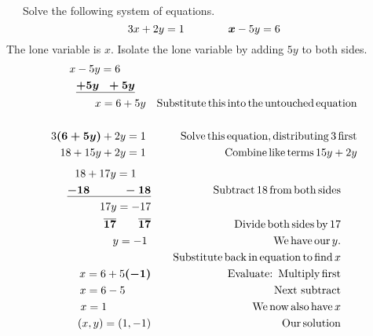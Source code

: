 \begin{example}~~~Solve the following system of equations.
	$$3 x + 2 y = 1\qquad\qquad \boldsymbol{x} - 5 y = 6$$
    The lone variable is $x$.  Isolate the lone variable by adding $5y$ to both sides.
		\begin{eqnarray*}		
		x - 5 y = 6~~~~~~~ & & \\
		\boldsymbol{\underline{+ 5 y ~~+ 5 y}}~~~  &  & \\
	  x = 6 + 5 y &  & \operatorname{Substitute} \operatorname{this} \operatorname{into} \operatorname{the}
  		\operatorname{untouched} \operatorname{equation}\\
    	& & \\
  		3 \boldsymbol{(6 + 5 y)} + 2 y = 1 &  & \operatorname{Solve} \operatorname{this}
    \operatorname{equation}, \operatorname{distributing} 3 \operatorname{first}\\
    18 + 15 y + 2 y = 1 &  & \operatorname{Combine} \operatorname{like} \operatorname{terms} 15 y + 2
    y\\
  \end{eqnarray*}
	\begin{eqnarray*}
			18 + 17 y = 1~~~~ &  &\\
    \boldsymbol{\underline{- 18 ~~~~~~~~~- 18}} &  & \operatorname{Subtract} 18 \operatorname{from} \operatorname{both}
    \operatorname{sides} \\
  		17 y = - 17 &  &\\
    \boldsymbol{\overline{17} ~~~~~~ \overline{17}} &  &  \operatorname{Divide} \operatorname{both} \operatorname{sides} \operatorname{by} 17\\
  	y = - 1 ~ &  & \operatorname{We} \operatorname{have} \operatorname{our} y.\\
		& & \operatorname{~~~Substitute} \operatorname{back} \operatorname{in} \operatorname{equation} \operatorname{to} \operatorname{find} x\\
    x = 6 + 5 \boldsymbol{(- 1)} &  & \operatorname{Evaluate:} \operatorname{~Multiply} \operatorname{first}\\
    x = 6 - 5~~~~~~~ &  & \operatorname{Next~subtract}\\
    x = 1~~~~~~~~~~~~ &  & \operatorname{We} \operatorname{now} \operatorname{also} \operatorname{have} x\\
    (x,y)=(1, - 1) &  & \operatorname{Our} \operatorname{solution}
  \end{eqnarray*}
\end{example}



